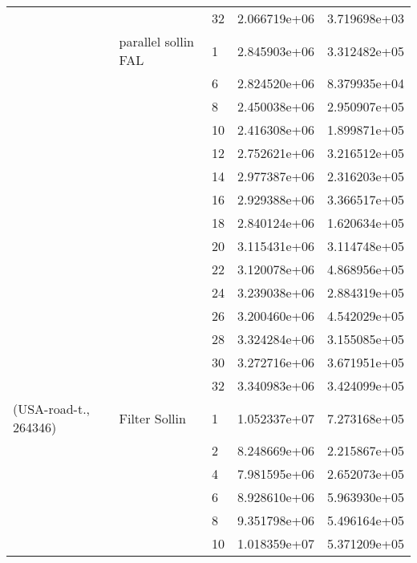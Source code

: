 \begin{tabular}{lllrr}
                      &                     & 32 &  2.066719e+06 &  3.719698e+03 \\
                      & parallel sollin FAL & 1  &  2.845903e+06 &  3.312482e+05 \\
                      &                     & 6  &  2.824520e+06 &  8.379935e+04 \\
                      &                     & 8  &  2.450038e+06 &  2.950907e+05 \\
                      &                     & 10 &  2.416308e+06 &  1.899871e+05 \\
                      &                     & 12 &  2.752621e+06 &  3.216512e+05 \\
                      &                     & 14 &  2.977387e+06 &  2.316203e+05 \\
                      &                     & 16 &  2.929388e+06 &  3.366517e+05 \\
                      &                     & 18 &  2.840124e+06 &  1.620634e+05 \\
                      &                     & 20 &  3.115431e+06 &  3.114748e+05 \\
                      &                     & 22 &  3.120078e+06 &  4.868956e+05 \\
                      &                     & 24 &  3.239038e+06 &  2.884319e+05 \\
                      &                     & 26 &  3.200460e+06 &  4.542029e+05 \\
                      &                     & 28 &  3.324284e+06 &  3.155085e+05 \\
                      &                     & 30 &  3.272716e+06 &  3.671951e+05 \\
                      &                     & 32 &  3.340983e+06 &  3.424099e+05 \\
(USA-road-t., 264346) & Filter Sollin & 1  &  1.052337e+07 &  7.273168e+05 \\
                      &                     & 2  &  8.248669e+06 &  2.215867e+05 \\
                      &                     & 4  &  7.981595e+06 &  2.652073e+05 \\
                      &                     & 6  &  8.928610e+06 &  5.963930e+05 \\
                      &                     & 8  &  9.351798e+06 &  5.496164e+05 \\
                      &                     & 10 &  1.018359e+07 &  5.371209e+05 \\

\end{tabular}
